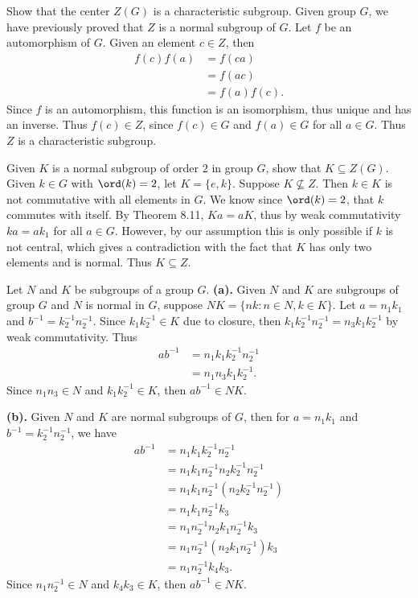 \begin{problem}[Exercise 6]{
    Show that the center $Z(G)$ is a characteristic subgroup.
}
    Given group $G$, we have previously proved that $Z$ is a normal subgroup of $G$.
    Let $f$ be an automorphism of $G$.
    Given an element $c \in Z$, then
    \begin{align*}
        f(c)f(a) &= f(ca)\\
        &= f(ac)\\
        &= f(a)f(c).
    \end{align*}
    Since $f$ is an automorphism, this function is an isomorphism, thus unique and has an inverse.
    Thus $f(c) \in Z$, since $f(c) \in G$ and $f(a) \in G$ for all $a \in G$.
    Thus $Z$ is a characteristic subgroup.
\end{problem}

\begin{problem}[Exercise 7]{
    Given $K$ is a normal subgroup of order $2$ in group $G$, show that $K \subseteq Z(G)$.
}
    Given $k \in G$ with $\ord(k) = 2$, let $K = \{e,k\}$.
    Suppose $K \not\subseteq Z$.
    Then $k \in K$ is not commutative with all elements in $G$.
    We know since $\ord(k) = 2$, that $k$ commutes with itself.
    By Theorem 8.11, $Ka = aK$, thus by weak commutativity $ka = ak_1$ for all $a \in G$.
    However, by our assumption this is only possible if $k$ is not central, which gives a contradiction with the fact that $K$ has only two elements and is normal.
    Thus $K \subseteq Z$.
\end{problem}

\begin{problem}[Exercise 8]{
    Let $N$ and $K$ be subgroups of a group $G$.
}
    \textbf{(a).}
    Given $N$ and $K$ are subgroups of group $G$ and $N$ is normal in $G$, suppose $NK = \{nk : n \in N, k \in K\}$.
    Let $a = n_1k_1$ and $b^{-1} = k_2^{-1}n_2^{-1}$.
    Since $k_1k_2^{-1} \in K$ due to closure, then $k_1k_2^{-1}n_2^{-1} = n_3k_1k_2^{-1}$ by weak commutativity.
    Thus
    \begin{align*}
        ab^{-1} &= n_1k_1k_2^{-1}n_2^{-1}\\
        &= n_1n_3k_1k_2^{-1}.
    \end{align*}
    Since $n_1n_3 \in N$ and $k_1k_2^{-1} \in K$, then $ab^{-1} \in NK$.

    \textbf{(b).}
    Given $N$ and $K$ are normal subgroups of $G$, then for $a = n_1k_1$ and $b^{-1} = k_2^{-1}n_2^{-1}$, we have
    \begin{align*}
        ab^{-1} &= n_1k_1k_2^{-1}n_2^{-1}\\
        &= n_1k_1n_2^{-1}n_2k_2^{-1}n_2^{-1}\\
        &= n_1k_1n_2^{-1}(n_2k_2^{-1}n_2^{-1})\\
        &= n_1k_1n_2^{-1}k_3\\
        &= n_1n_2^{-1}n_2k_1n_2^{-1}k_3\\
        &= n_1n_2^{-1}(n_2k_1n_2^{-1})k_3\\
        &= n_1n_2^{-1}k_4k_3.
    \end{align*}
    Since $n_1n_2^{-1} \in N$ and $k_4k_3 \in K$, then $ab^{-1} \in NK$.
\end{problem}

